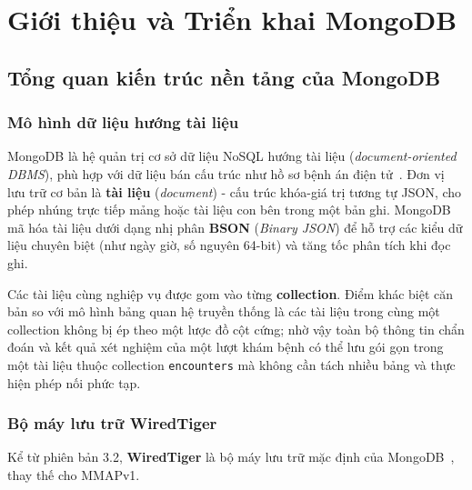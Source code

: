 \chapter{Giới thiệu và Triển khai MongoDB}
\label{chap:mongodb-intro}

\section{Tổng quan kiến trúc nền tảng của MongoDB}

\subsection{Mô hình dữ liệu hướng tài liệu}

MongoDB là hệ quản trị cơ sở dữ liệu NoSQL hướng tài liệu (\textit{document-oriented DBMS}), phù hợp với dữ liệu bán cấu trúc như hồ sơ bệnh án điện tử~\cite{MongoDBSharding,Freire2016}. Đơn vị lưu trữ cơ bản là \textbf{tài liệu} (\textit{document}) - cấu trúc khóa-giá trị tương tự JSON, cho phép nhúng trực tiếp mảng hoặc tài liệu con bên trong một bản ghi. MongoDB mã hóa tài liệu dưới dạng nhị phân \textbf{BSON} (\textit{Binary JSON}) để hỗ trợ các kiểu dữ liệu chuyên biệt (như ngày giờ, số nguyên 64-bit) và tăng tốc phân tích khi đọc ghi.

Các tài liệu cùng nghiệp vụ được gom vào từng \textbf{collection}. Điểm khác biệt căn bản so với mô hình bảng quan hệ truyền thống là các tài liệu trong cùng một collection không bị ép theo một lược đồ cột cứng; nhờ vậy toàn bộ thông tin chẩn đoán và kết quả xét nghiệm của một lượt khám bệnh có thể lưu gói gọn trong một tài liệu thuộc collection \texttt{encounters} mà không cần tách nhiều bảng và thực hiện phép nối phức tạp.

\subsection{Bộ máy lưu trữ WiredTiger}

Kể từ phiên bản 3.2, \textbf{WiredTiger} là bộ máy lưu trữ mặc định của MongoDB~\cite{MongoDBWiredTiger}, thay thế cho MMAPv1.

